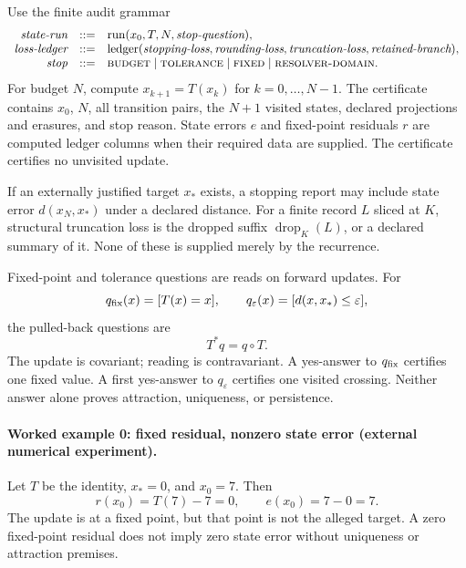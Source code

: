 Use the finite audit grammar
\[
\begin{array}{rcl}
\textit{state-run}&::=&
 \operatorname{run}(x_0,T,N,\textit{stop-question}),\\
\textit{loss-ledger}&::=&
 \operatorname{ledger}(\textit{stopping-loss},\textit{rounding-loss},
                       \textit{truncation-loss},\textit{retained-branch}),\\
\textit{stop}&::=&\textsc{budget}\mid\textsc{tolerance}\mid
 \textsc{fixed}\mid\textsc{resolver-domain}.
\end{array}
\]
For budget \(N\), compute \(x_{k+1}=T(x_k)\) for \(k=0,\ldots,N-1\).  The certificate contains \(x_0\), \(N\), all
transition pairs, the \(N+1\) visited states, declared projections and erasures, and stop reason.  State errors \(e\)
and fixed-point residuals \(r\) are computed ledger columns when their required data are supplied.  The certificate certifies no
unvisited update.

If an externally justified target \(x_*\) exists, a stopping report may include state error
\(d(x_N,x_*)\) under a declared distance.  For a finite record \(L\) sliced at \(K\), structural truncation loss is the dropped suffix
\(\operatorname{drop}_K(L)\), or a declared summary of it.  None of these is supplied merely by the recurrence.

Fixed-point and tolerance questions are reads on forward updates.  For
\[
 q_{\rm fix}(x)=[T(x)=x],\qquad
 q_\varepsilon(x)=[d(x,x_*)\le\varepsilon],
\]
the pulled-back questions are
\[
                         T^*q=q\circ T.
\]
The update is covariant; reading is contravariant.  A yes-answer to \(q_{\rm fix}\) certifies one fixed value.  A first
yes-answer to \(q_\varepsilon\) certifies one visited crossing.  Neither answer alone proves attraction, uniqueness, or
persistence.

\paragraph{Worked example 0: fixed residual, nonzero state error (external numerical experiment).}
Let \(T\) be the identity, \(x_*=0\), and \(x_0=7\).  Then
\[
                    r(x_0)=T(7)-7=0,\qquad e(x_0)=7-0=7.
\]
The update is at a fixed point, but that point is not the alleged target.  A zero fixed-point residual does not imply
zero state error without uniqueness or attraction premises.


